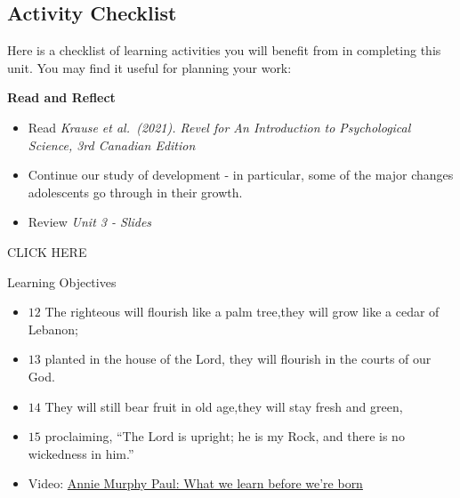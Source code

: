 \documentclass[
]{book}
\providecommand{\tightlist}{%
  \setlength{\itemsep}{0pt}\setlength{\parskip}{0pt}}
\begin{document}
\hypertarget{activity-checklist}{%
\subsection*{Activity Checklist}\label{activity-checklist}}

\begin{reflect}
Here is a checklist of learning activities you will benefit from in completing this unit. You may find it useful for planning your work:

\textbf{Read and Reflect}

\begin{itemize}
\tightlist
\item
  Read \emph{Krause et al.~(2021). Revel for An Introduction to Psychological Science, 3rd Canadian Edition}\\
\item
  Continue our study of development - in particular, some of the major changes adolescents go through in their growth.\\
\item
  Review \emph{Unit 3 - Slides}
\end{itemize}

CLICK HERE

Learning Objectives

\begin{itemize}
\tightlist
\item
  \(\scriptstyle 12\) The righteous will flourish like a palm tree,they will grow like a cedar of Lebanon;\\
\item
  \(\scriptstyle 13\) planted in the house of the Lord, they will flourish in the courts of our God.\\
\item
  \(\scriptstyle 14\) They will still bear fruit in old age,they will stay fresh and green,\\
\item
  \(\scriptstyle 15\) proclaiming, ``The Lord is upright; he is my Rock, and there is no wickedness in him.''\\
\item
  Video: \href{http://www.ted.com/talks/annie_murphy_paul_what_we_learn_before_we_re_born.html}{Annie Murphy Paul: What we learn before we're born}
\end{itemize}


\end{reflect}
\end{document}
